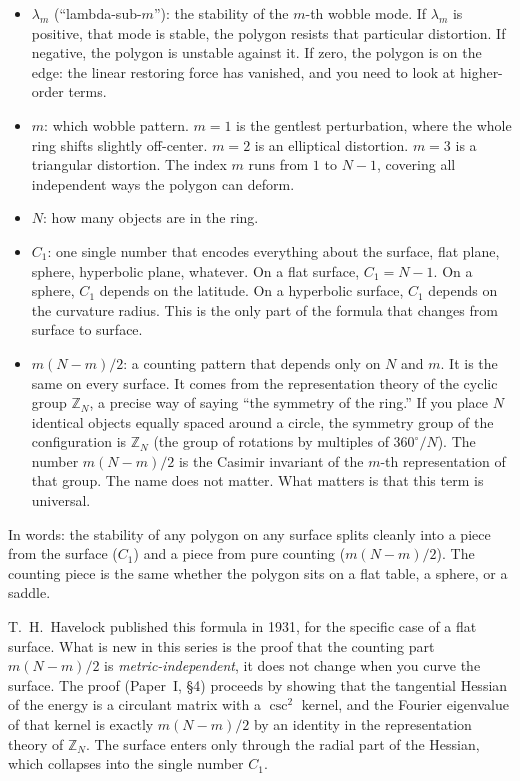 \begin{itemize}
\item $\lambda_m$ (``lambda-sub-$m$''): the stability of the $m$-th
  wobble mode. If $\lambda_m$ is positive, that mode is stable, the
  polygon resists that particular distortion. If negative, the polygon
  is unstable against it. If zero, the polygon is on the edge: the
  linear restoring force has vanished, and you need to look at
  higher-order terms.

\item $m$: which wobble pattern. $m = 1$ is the gentlest perturbation,
  where the whole ring shifts slightly off-center. $m = 2$ is an
  elliptical distortion. $m = 3$ is a triangular distortion. The index
  $m$ runs from $1$ to $N - 1$, covering all independent ways the
  polygon can deform.

\item $N$: how many objects are in the ring.

\item $C_1$: one single number that encodes everything about the
  surface, flat plane, sphere, hyperbolic plane, whatever. On a flat
  surface, $C_1 = N - 1$. On a sphere, $C_1$ depends on the latitude.
  On a hyperbolic surface, $C_1$ depends on the curvature radius. This
  is the only part of the formula that changes from surface to surface.

\item $m(N-m)/2$: a counting pattern that depends only on $N$ and $m$.
  It is the same on every surface. It comes from the representation
  theory of the cyclic group $\mathbb{Z}_N$, a precise way of saying
  ``the symmetry of the ring.'' If you place $N$ identical objects
  equally spaced around a circle, the symmetry group of the
  configuration is $\mathbb{Z}_N$ (the group of rotations by multiples
  of $360^\circ/N$). The number $m(N-m)/2$ is the Casimir invariant of the
  $m$-th representation of that group. The name does not matter. What
  matters is that this term is universal.
\end{itemize}

In words: the stability of any polygon on any surface splits cleanly
into a piece from the surface ($C_1$) and a piece from pure counting
($m(N-m)/2$). The counting piece is the same whether the polygon sits
on a flat table, a sphere, or a saddle.

T.~H.~Havelock published this formula in 1931, for the specific case
of a flat surface. What is new in this series is the proof that the
counting part $m(N-m)/2$ is \emph{metric-independent}, it does not
change when you curve the surface. The proof (Paper~I, \S4) proceeds
by showing that the tangential Hessian of the energy is a circulant
matrix with a $\csc^2$ kernel, and the Fourier eigenvalue of that
kernel is exactly $m(N-m)/2$ by an identity in the representation
theory of $\mathbb{Z}_N$. The surface enters only through the radial
part of the Hessian, which collapses into the single number $C_1$.

